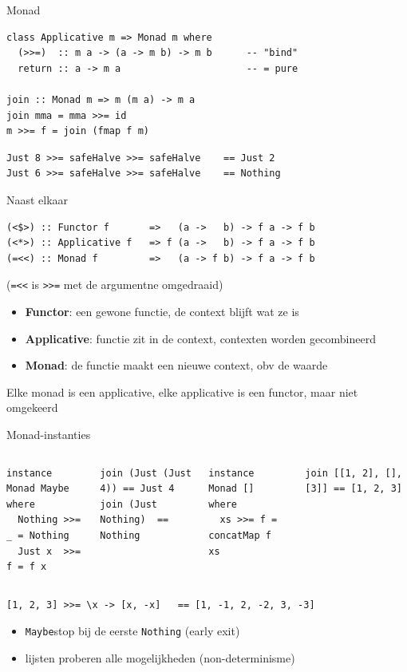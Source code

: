\documentclass[aspectratio=169,11pt]{beamer}
\newcommand{\hs}{\lstinline[style=hsinline]}
\begin{document}
\begin{frame}[fragile]{Monad}
\begin{lstlisting}
class Applicative m => Monad m where
  (>>=)  :: m a -> (a -> m b) -> m b      -- "bind"
  return :: a -> m a                      -- = pure

join :: Monad m => m (m a) -> m a
join mma = mma >>= id
m >>= f = join (fmap f m)
\end{lstlisting}
\pause 
\begin{lstlisting}
Just 8 >>= safeHalve >>= safeHalve    == Just 2
Just 6 >>= safeHalve >>= safeHalve    == Nothing
\end{lstlisting}
\end{frame}

\begin{frame}[fragile]{Naast elkaar}
\begin{lstlisting}
(<$>) :: Functor f       =>   (a ->   b) -> f a -> f b
(<*>) :: Applicative f   => f (a ->   b) -> f a -> f b
(=<<) :: Monad f         =>   (a -> f b) -> f a -> f b
\end{lstlisting}
(\hs|=<<| is \hs|>>=| met de argumentne omgedraaid)
\pause
\begin{itemize}
\item \textbf{Functor}: een gewone functie, de context blijft wat ze is
\item \textbf{Applicative}: functie zit in de context, contexten worden \alert{gecombineerd}
\item \textbf{Monad}: de functie \alert{maakt} een nieuwe context, obv de waarde
\end{itemize}
Elke monad is een applicative, elke applicative is een functor, maar niet omgekeerd
\end{frame}

\begin{frame}[fragile]{Monad-instanties}
  \begin{columns}[T]
\begin{lstlisting}
instance Monad Maybe where
  Nothing >>= _ = Nothing
  Just x  >>= f = f x
\end{lstlisting}
\begin{lstlisting}
join (Just (Just 4)) == Just 4
join (Just Nothing)  == Nothing
\end{lstlisting}
\begin{lstlisting}
instance Monad [] where
  xs >>= f = concatMap f xs
\end{lstlisting}
\begin{lstlisting}
join [[1, 2], [], [3]] == [1, 2, 3]
\end{lstlisting}
  \end{columns}
  \pause
\begin{lstlisting}
[1, 2, 3] >>= \x -> [x, -x]   == [1, -1, 2, -2, 3, -3]
\end{lstlisting}
  \pause
  \begin{itemize}
    \item \hs{Maybe}stop bij de eerste \hs{Nothing} (\alert{early exit})
    \item lijsten proberen alle mogelijkheden (\alert{non-determinisme})
  \end{itemize}
\end{frame}
\end{document}
